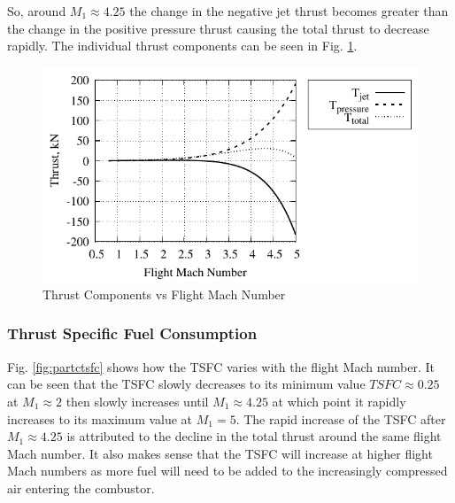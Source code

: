 \documentclass[conf]{new-aiaa} %
\begin{document}
So, around $M_1\approx4.25$ the change in the negative jet thrust becomes greater than the change in the positive pressure thrust causing the total thrust to decrease rapidly. The individual thrust components can be seen in Fig. \ref{fig:partcallthrust}.

\begin{figure}[H] %
    \centering
    \includegraphics[]{media/performance_parameter_files/part_c_all_thrust.pdf}
    \caption{\label{fig:partcallthrust}Thrust Components vs Flight Mach Number}
\end{figure}

\subsubsection{Thrust Specific Fuel Consumption}
Fig. \ref{fig:partctsfc} shows how the TSFC varies with the flight Mach number. It can be seen that the TSFC slowly decreases to its minimum value $TSFC\approx0.25$ at $M_1\approx2$ then slowly increases until $M_1\approx4.25$ at which point it rapidly increases to its maximum value at $M_1=5$. The rapid increase of the TSFC after $M_1\approx4.25$ is attributed to the decline in the total thrust around the same flight Mach number. It also makes sense that the TSFC will increase at higher flight Mach numbers as more fuel will need to be added to the increasingly compressed air entering the combustor.
\end{document}

